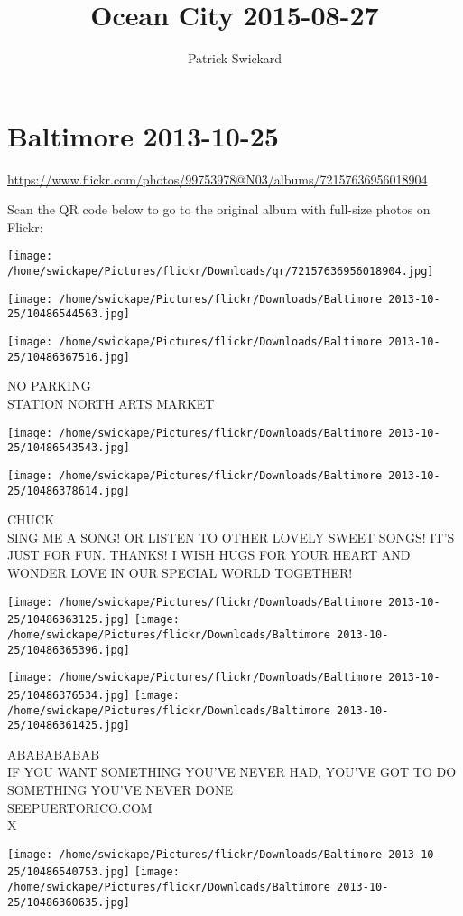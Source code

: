 \documentclass[10pt,letterpaper]{article}
\title{Ocean City 2015-08-27}
\author{Patrick Swickard}
\date{}
\begin{document}
\section*{Baltimore 2013-10-25}

\url{https://www.flickr.com/photos/99753978@N03/albums/72157636956018904}

Scan the QR code below to go to the original album with full-size photos on Flickr:

\texttt{[image: /home/swickape/Pictures/flickr/Downloads/qr/72157636956018904.jpg]}
\pagebreak

\texttt{[image: /home/swickape/Pictures/flickr/Downloads/Baltimore 2013-10-25/10486544563.jpg]}

\vspace{0.25in}
\texttt{[image: /home/swickape/Pictures/flickr/Downloads/Baltimore 2013-10-25/10486367516.jpg]}

NO PARKING\\
STATION NORTH ARTS MARKET
\pagebreak

\texttt{[image: /home/swickape/Pictures/flickr/Downloads/Baltimore 2013-10-25/10486543543.jpg]}

\vspace{0.25in}
\texttt{[image: /home/swickape/Pictures/flickr/Downloads/Baltimore 2013-10-25/10486378614.jpg]}

CHUCK\\
SING ME A SONG!  OR LISTEN TO OTHER LOVELY SWEET SONGS! IT'S JUST FOR FUN. THANKS! I WISH HUGS FOR YOUR HEART AND WONDER LOVE IN OUR SPECIAL WORLD TOGETHER!
\pagebreak

\texttt{[image: /home/swickape/Pictures/flickr/Downloads/Baltimore 2013-10-25/10486363125.jpg]}
\texttt{[image: /home/swickape/Pictures/flickr/Downloads/Baltimore 2013-10-25/10486365396.jpg]}

\texttt{[image: /home/swickape/Pictures/flickr/Downloads/Baltimore 2013-10-25/10486376534.jpg]}
\texttt{[image: /home/swickape/Pictures/flickr/Downloads/Baltimore 2013-10-25/10486361425.jpg]}

ABABABABAB\\
IF YOU WANT SOMETHING YOU'VE NEVER HAD, YOU'VE GOT TO DO SOMETHING YOU'VE NEVER DONE\\
SEEPUERTORICO.COM\\
X
\pagebreak

\texttt{[image: /home/swickape/Pictures/flickr/Downloads/Baltimore 2013-10-25/10486540753.jpg]}
\texttt{[image: /home/swickape/Pictures/flickr/Downloads/Baltimore 2013-10-25/10486360635.jpg]}
\end{document}
